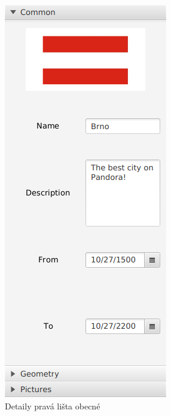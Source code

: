 \documentclass[12pt,a4paper,titlepage]{article}
\begin{document}
\begin{figure}[!htbp]
	\centering
	\includegraphics[scale=0.4]{right_bar1}
	\caption{Detaily pravá lišta obecné}
	\label{rightBar}
\end{figure}
\end{document}
